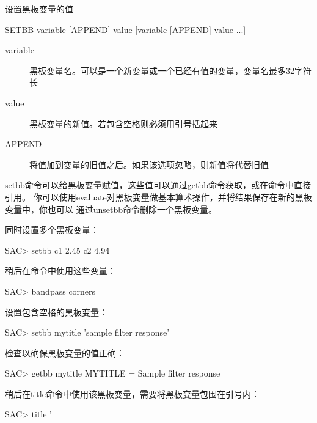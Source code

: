 \label{cmd:setbb}

设置黑板变量的值

\begin{SACSTX}
SETBB variable  [APPEND] value [variable [APPEND] value ...]
\end{SACSTX}

\begin{description}
\item [variable] 黑板变量名。可以是一个新变量或一个已经有值的变量，变量名最多32字符长
\item [value] 黑板变量的新值。若包含空格则必须用引号括起来
\item [APPEND] 将值加到变量的旧值之后。如果该选项忽略，则新值将代替旧值
\end{description}

setbb命令可以给黑板变量赋值，这些值可以通过getbb命令获取，或在命令中直接引用。
你可以使用evaluate对黑板变量做基本算术操作，并将结果保存在新的黑板变量中，你也可以
通过unsetbb命令删除一个黑板变量。

同时设置多个黑板变量：
\begin{SACCode}
SAC> setbb c1 2.45 c2 4.94
\end{SACCode}

稍后在命令中使用这些变量：
\begin{SACCode}
SAC> bandpass corners %
\end{SACCode}

设置包含空格的黑板变量：
\begin{SACCode}
SAC> setbb mytitle 'sample filter response'
\end{SACCode}

检查以确保黑板变量的值正确：
\begin{SACCode}
SAC> getbb mytitle
 MYTITLE = Sample filter response
\end{SACCode}

稍后在title命令中使用该黑板变量，需要将黑板变量包围在引号内：
\begin{SACCode}
SAC> title '%
\end{SACCode}
